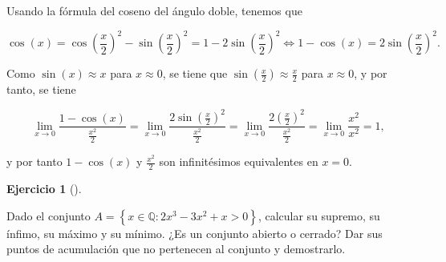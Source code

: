 \documentclass[
  spanish,
  a4paper,
]{scrreport}
\theoremstyle{definition}
\newtheorem{exercise}{Ejercicio}[chapter]
\theoremstyle{remark}
\begin{document}
\begin{tcolorbox}[enhanced jigsaw, arc=.35mm, bottomrule=.15mm, bottomtitle=1mm, breakable, colback=white, colbacktitle=quarto-callout-tip-color!10!white, colframe=quarto-callout-tip-color-frame, coltitle=black, left=2mm, leftrule=.75mm, opacityback=0, opacitybacktitle=0.6, rightrule=.15mm, title=\textcolor{quarto-callout-tip-color}{\faLightbulb}\hspace{0.5em}{Solución}, titlerule=0mm, toprule=.15mm, toptitle=1mm]

Usando la fórmula del coseno del ángulo doble, tenemos que

\[
\cos(x) = \cos\left(\frac{x}{2}\right)^2 - \sin\left(\frac{x}{2}\right)^2 = 1 - 2\sin\left(\frac{x}{2}\right)^2 \Leftrightarrow 1 - \cos(x) = 2\sin\left(\frac{x}{2}\right)^2.
\]

Como \(\sin(x) \approx x\) para \(x\approx 0\), se tiene que
\(\sin\left(\frac{x}{2}\right) \approx \frac{x}{2}\) para
\(x\approx 0\), y por tanto, se tiene

\[
\lim_{x\to 0} \frac{1-\cos(x)}{\frac{x^2}{2}} = \lim_{x\to 0} \frac{2\sin\left(\frac{x}{2}\right)^2}{\frac{x^2}{2}} = \lim_{x\to 0} \frac{2\left(\frac{x}{2}\right)^2}{\frac{x^2}{2}} = \lim_{x\to 0} \frac{x^2}{x^2} = 1,
\]

y por tanto \(1-\cos(x)\) y \(\frac{x^2}{2}\) son infinitésimos
equivalentes en \(x=0\).

\end{tcolorbox}

\begin{exercise}[]\protect\hypertarget{exr-4}{}\label{exr-4}

Dado el conjunto \(A=\left\{x\in\mathbb{Q}: 2x^3-3x^2+x>0\right\}\),
calcular su supremo, su ínfimo, su máximo y su mínimo. ¿Es un conjunto
abierto o cerrado? Dar sus puntos de acumulación que no pertenecen al
conjunto y demostrarlo.

\end{exercise}
\end{document}
